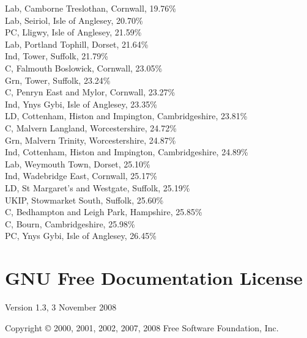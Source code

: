 \documentclass[a4paper,openany,10pt]{book}
\begin{document}
Lab, Camborne Treslothan, Cornwall, 19.76\%\\
Lab, Seiriol, Isle of Anglesey, 20.70\%\\
PC, Lligwy, Isle of Anglesey, 21.59\%\\
Lab, Portland Tophill, Dorset, 21.64\%\\
Ind, Tower, Suffolk, 21.79\%\\
C, Falmouth Boslowick, Cornwall, 23.05\%\\
Grn, Tower, Suffolk, 23.24\%\\
C, Penryn East and Mylor, Cornwall, 23.27\%\\
Ind, Ynys Gybi, Isle of Anglesey, 23.35\%\\
LD, Cottenham, Histon and Impington, Cambridgeshire, 23.81\%\\
C, Malvern Langland, Worcestershire, 24.72\%\\
Grn, Malvern Trinity, Worcestershire, 24.87\%\\
Ind, Cottenham, Histon and Impington, Cambridgeshire, 24.89\%\\
Lab, Weymouth Town, Dorset, 25.10\%\\
Ind, Wadebridge East, Cornwall, 25.17\%\\
LD, St Margaret's and Westgate, Suffolk, 25.19\%\\
UKIP, Stowmarket South, Suffolk, 25.60\%\\
C, Bedhampton and Leigh Park, Hampshire, 25.85\%\\
C, Bourn, Cambridgeshire, 25.98\%\\
PC, Ynys Gybi, Isle of Anglesey, 26.45\%\\



\chapter*{{GNU Free Documentation License}}
\pagestyle{plain}

       Version 1.3, 3 November 2008


 Copyright \copyright{} 2000, 2001, 2002, 2007, 2008  Free Software Foundation, Inc.
 
 \bigskip
 
\end{document}
